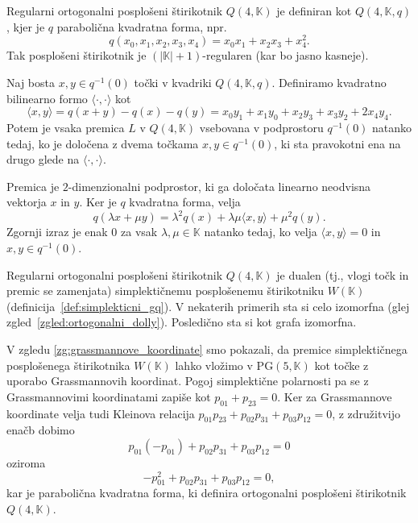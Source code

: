 \documentclass[fin1, tisk]{fmfdelo}
\newcommand{\PG}{\mathrm{PG}}
\begin{document}
\begin{definicija}\label{def:regularni_ortogonalni_gq}
    Regularni ortogonalni posplošeni štirikotnik $Q(4, \mathbb{K})$ je definiran kot $Q(4, \mathbb{K}, q)$, kjer je
    $q$ parabolična kvadratna forma, npr.~\[q(x_0, x_1, x_2, x_3, x_4) = x_0x_1 + x_2x_3 + x_4^2.\]
    Tak posplošeni štirikotnik je $(|\mathbb{K}| + 1)$-regularen (kar bo jasno kasneje).
\end{definicija}

\begin{trditev}\label{tr:kvadratna_v_bilinearna}
    Naj bosta $x, y\in q^{-1}(0)$ točki v kvadriki $Q(4, \mathbb{K}, q)$. Definiramo kvad\-rat\-no bilinearno formo $\langle \cdot, \cdot\rangle$ kot
    \[\langle x, y\rangle = q(x+y) - q(x) - q(y) = x_0y_1 + x_1y_0 + x_2y_3 + x_3y_2 + 2x_4y_4.\]
    Potem je vsaka premica $L$ v $Q(4, \mathbb{K})$ vsebovana v podprostoru $q^{-1}(0)$ natanko tedaj, ko je
    določena z dvema točkama $x, y\in q^{-1}(0)$, ki sta pravokotni ena na drugo glede na $\langle \cdot, \cdot\rangle$.
\end{trditev}

\begin{dokaz}
    Premica je $2$-dimenzionalni podprostor, ki ga določata linearno neodvisna vektorja $x$ in $y$.
    Ker je $q$ kvadratna forma, velja $$q(\lambda x + \mu y) = \lambda^2 q(x) + \lambda\mu \langle x, y\rangle + \mu^2 q(y).$$
    Zgornji izraz je enak $0$ za vsak $\lambda, \mu\in\mathbb{K}$ natanko tedaj, ko velja $\langle x, y\rangle = 0$ in $x,y\in q^{-1}(0)$.
\end{dokaz}

\begin{trditev}
    Regularni ortogonalni posplošeni štirikotnik $Q(4, \mathbb{K})$ je dualen (tj., vlogi točk in premic se zamenjata) simplektičnemu 
    posplošenemu štirikotniku $W(\mathbb{K})$ (definicija~\ref{def:simplekticni_gq}). V nekaterih primerih sta si celo izomorfna (glej zgled~\ref{zgled:ortogonalni_dolly}).
    Posledično sta si kot grafa izomorfna.
\end{trditev}

\begin{dokaz}
    V zgledu \ref{zg:grassmannove_koordinate} smo pokazali, da premice simplektičnega posplošenega štirikotnika $W(\mathbb{K})$ 
    lahko vložimo v $\PG(5, \mathbb{K})$ kot točke z uporabo Grassmannovih koordinat. Pogoj simplektične polarnosti pa 
    se z Grassmannovimi koordinatami zapiše kot $p_{01} + p_{23} = 0$. Ker za Grassmannove koordinate velja tudi Kleinova relacija 
    $p_{01}p_{23} + p_{02}p_{31} + p_{03}p_{12} = 0$, z združitvijo enačb dobimo 
    $$p_{01}(-p_{01}) + p_{02}p_{31} + p_{03}p_{12} = 0$$
    oziroma
    $$-p_{01}^2 + p_{02}p_{31} + p_{03}p_{12} = 0,$$
    kar je parabolična kvadratna forma, ki definira ortogonalni posplošeni štirikotnik $Q(4, \mathbb{K})$.
\end{dokaz}
\end{document}
